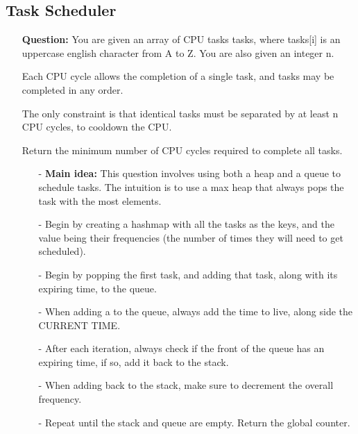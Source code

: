 \documentclass[12pt]{article}
\begin{document}
\subsection{Task Scheduler}
\begin{enumerate}
  \item[] \textbf{Question:} You are given an array of CPU tasks tasks, where tasks[i] is an uppercase english character from A to Z. You are also given an integer n.

Each CPU cycle allows the completion of a single task, and tasks may be completed in any order.

The only constraint is that identical tasks must be separated by at least n CPU cycles, to cooldown the CPU.

Return the minimum number of CPU cycles required to complete all tasks.


    \begin{enumerate}
      \item[-] \textbf{Main idea:} This question involves using both a heap and a queue to schedule tasks. The intuition is to use a max heap that always pops the task with the most elements. 
      \item[-] Begin by creating a hashmap with all the tasks as the keys, and the value being their frequencies (the number of times they will need to get scheduled). 
      \item[-] Begin by popping the first task, and adding that task, along with its expiring time, to the queue. 
      \item[-] When adding a to the queue, always add the time to live, along side the CURRENT TIME. 
      \item[-] After each iteration, always check if the front of the queue has an expiring time, if so, add it back to the stack.
      \item[-] When adding back to the stack, make sure to decrement the overall frequency.
      \item[-] Repeat until the stack and queue are empty. Return the global counter.
    \end{enumerate}
\end{enumerate}
\end{document}
